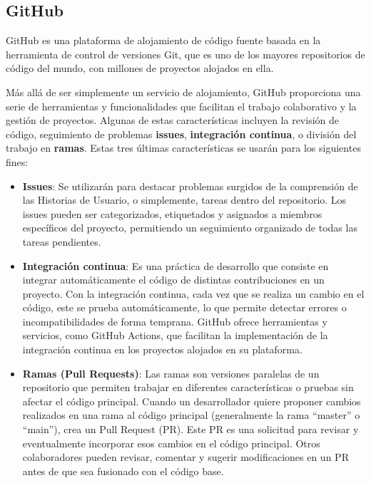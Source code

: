 \subsection{GitHub}

GitHub es una plataforma de alojamiento de código fuente basada en la herramienta de control de versiones Git, que es uno de los mayores repositorios de código del mundo, con millones de proyectos alojados en ella.



Más allá de ser simplemente un servicio de alojamiento, GitHub proporciona una serie de herramientas y funcionalidades que facilitan el trabajo colaborativo y la gestión de proyectos. Algunas de estas características incluyen la revisión de código, seguimiento de problemas \textbf{issues}, \textbf{integración continua}, o división del trabajo en \textbf{ramas}. Estas tres últimas características se usarán para los siguientes fines:

\begin{itemize}
    \item \textbf{Issues}: Se utilizarán para destacar problemas surgidos de la comprensión de las Historias de Usuario, o simplemente, tareas dentro del repositorio. Los issues pueden ser categorizados, etiquetados y asignados a miembros específicos del proyecto, permitiendo un seguimiento organizado de todas las tareas pendientes.
    
    \item \textbf{Integración continua}: Es una práctica de desarrollo que consiste en integrar automáticamente el código de distintas contribuciones en un proyecto. Con la integración continua, cada vez que se realiza un cambio en el código, este se prueba automáticamente, lo que permite detectar errores o incompatibilidades de forma temprana. GitHub ofrece herramientas y servicios, como GitHub Actions, que facilitan la implementación de la integración continua en los proyectos alojados en su plataforma.
    
    \item \textbf{Ramas (Pull Requests)}: Las ramas son versiones paralelas de un repositorio que permiten trabajar en diferentes características o pruebas sin afectar el código principal. Cuando un desarrollador quiere proponer cambios realizados en una rama al código principal (generalmente la rama ``master'' o ``main''), crea un Pull Request (PR). Este PR es una solicitud para revisar y eventualmente incorporar esos cambios en el código principal. Otros colaboradores pueden revisar, comentar y sugerir modificaciones en un PR antes de que sea fusionado con el código base.
\end{itemize}

